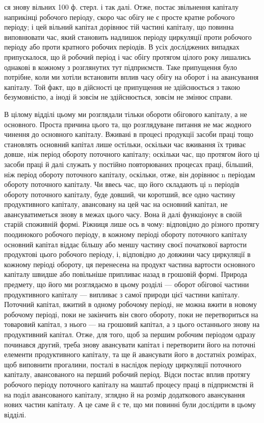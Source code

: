 ся знову вільних 100 ф. стерл. і так далі. Отже, постає звільнення капіталу
наприкінці робочого періоду, скоро час обігу не є просте кратне
робочого періоду; і цей вільний капітал дорівнює тій частині капіталу,
що повинна виповнювати час, який становить надлишок періоду циркуляції
проти робочого періоду або проти кратного робочих періодів.
В усіх досліджених випадках припускалося, що й робочий період і
час обігу протягом цілого року лишались однакові в кожному з розглянутих
тут підприємств. Таке припущення було потрібне, коли ми хотіли
встановити вплив часу обігу на оборот і на авансування капіталу. Той
факт, що в дійсності це припущення не здійснюється з такою безумовністю,
а іноді й зовсім не здійснюється, зовсім не змінює справи.

В цілому відділі цьому ми розглядали тільки обороти обігового капіталу,
а не основного. Проста причина цього та, що розглядуване питання
не має жодного чинення до основного капіталу. Вживані в процесі продукції
засоби праці тощо становлять основний капітал лише остільки,
оскільки час вживання їх триває довше, ніж період обороту поточного
капіталу; оскільки час, що протягом його ці засоби праці й далі служать
у постійно повторюваних процесах праці, більший, ніж період обороту
поточного капіталу, оскільки, отже, він дорівнює n періодам обороту
поточного капіталу. Чи ввесь час, що його складають ці n періодів обороту
поточного капіталу, буде довший, чи коротший, все одно частину
продуктивного капіталу, авансовану на цей час на основний капітал, не
авансуватиметься знову в межах цього часу. Вона й далі функціонує в
своїй старій споживній формі. Ріжниця лише ось в чому: відповідно до
різного протягу поодинокого робочого періоду, в кожному періоді
обороту поточного капіталу основний капітал віддає більшу або меншу
частину своєї початкової вартости продуктові цього робочого періоду, і,
відповідно до довжини часу циркуляції в кожному періоді обороту, ця
перенесена на продукт частина вартости основного капіталу швидше або
повільніше припливає назад в грошовій формі. Природа предмету, що
його ми розглядаємо в цьому розділі — оборот обігової частини продуктивного
капіталу — випливає з самої природи цієї частини капіталу. Поточний
капітал, вжитий в одному робочому періоді, не можна вжити в
новому робочому періоді, поки не закінчить він свого обороту, поки не
перетвориться на товаровий капітал, з нього — на грошовий капітал, а
з цього останнього знову на продуктивний капітал. Отже, для того, щоб
за першим робочим періодом одразу починався другий, треба знову
авансувати капітал і перетворити його на поточні елементи продуктивного
капіталу, та ще й авансувати його в достатніх розмірах, щоб виповнити
прогалини, посталі в наслідок періоду циркуляції поточного
капіталу, авансованого на перший робочий період. Відси постає вплив
протягу робочого періоду поточного капіталу на маштаб процесу праці
в підприємстві й на поділ авансованого капіталу, зглядно й на розмір
додаткового авансування нових частин капіталу. А це саме й є те, що ми
повинні були дослідити в цьому відділі.
